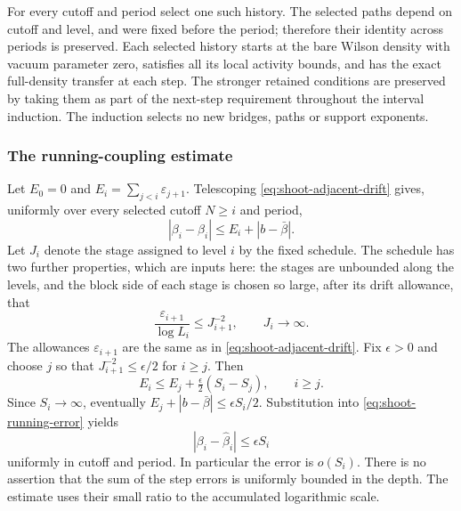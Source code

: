For every cutoff and period select one such history. The selected
paths depend on cutoff and level, and were fixed before the period;
therefore their identity across periods is preserved. Each selected
history starts at the bare Wilson density with vacuum parameter zero,
satisfies all its local activity bounds, and has the exact full-density
transfer at each step. The stronger retained conditions are preserved
by taking them as part of the next-step requirement throughout the
interval induction. The induction selects no new bridges, paths or
support exponents.

\subsubsection{The running-coupling estimate}
Let
$E_0=0$ and $E_i=\sum_{j<i}\varepsilon_{j+1}$.
Telescoping \eqref{eq:shoot-adjacent-drift} gives, uniformly over every
selected cutoff $N\ge i$ and period,
\begin{equation}\label{eq:shoot-running-error}
            |\beta_i-\widehat\beta_i|\le E_i+|b-\bar\beta|.
\end{equation}
Let $J_i$ denote the stage assigned to level $i$ by the fixed
schedule. The schedule has two further properties, which are inputs
here: the stages are unbounded along the levels, and the block side
of each stage is chosen so large, after its drift allowance, that
\begin{equation}\label{eq:shoot-drift-ratio}
 \frac{\varepsilon_{i+1}}{\log L_i}\le J_{i+1}^{-2},
                  \qquad J_i\longrightarrow\infty.
\end{equation}
The allowances $\varepsilon_{i+1}$ are the same as in
\eqref{eq:shoot-adjacent-drift}.
Fix $\epsilon>0$ and choose $j$ so that $J_{i+1}^{-2}\le\epsilon/2$
for $i\ge j$. Then
\[
 E_i\le E_j+\tfrac\epsilon2(S_i-S_j),\qquad i\ge j.
\]
Since $S_i\to\infty$, eventually
$E_j+|b-\bar\beta|\le\epsilon S_i/2$. Substitution into
\eqref{eq:shoot-running-error} yields
\[
                 |\beta_i-\widehat\beta_i|\le\epsilon S_i
\]
uniformly in cutoff and period. In particular the error is $o(S_i)$.
There is no assertion that the sum of the step errors is uniformly
bounded in the depth. The estimate uses their small ratio to the
accumulated logarithmic scale.

